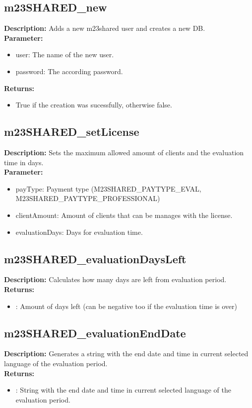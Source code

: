 \subsection{m23SHARED\_new}
\textbf{Description:} Adds a new m23shared user and creates a new DB.\\
\textbf{Parameter:}
\begin{itemize}
\item user: The name of the new user.
\item password: The according password.
\end{itemize}
\textbf{Returns:}
\begin{itemize}
\item True if the creation was sucessfully, otherwise false.
\end{itemize}

\subsection{m23SHARED\_setLicense}
\textbf{Description:} Sets the maximum allowed amount of clients and the evaluation time in days.\\
\textbf{Parameter:}
\begin{itemize}
\item payType: Payment type (M23SHARED\_PAYTYPE\_EVAL, M23SHARED\_PAYTYPE\_PROFESSIONAL)
\item clientAmount: Amount of clients that can be manages with the license.
\item evaluationDays: Days for evaluation time.
\end{itemize}

\subsection{m23SHARED\_evaluationDaysLeft}
\textbf{Description:} Calculates how many days are left from evaluation period.\\
\textbf{Returns:}
\begin{itemize}
\item : Amount of days left (can be negative too if the evaluation time is over)
\end{itemize}

\subsection{m23SHARED\_evaluationEndDate}
\textbf{Description:} Generates a string with the end date and time in current selected language of the evaluation period.\\
\textbf{Returns:}
\begin{itemize}
\item : String with the end date and time in current selected language of the evaluation period.
\end{itemize}

